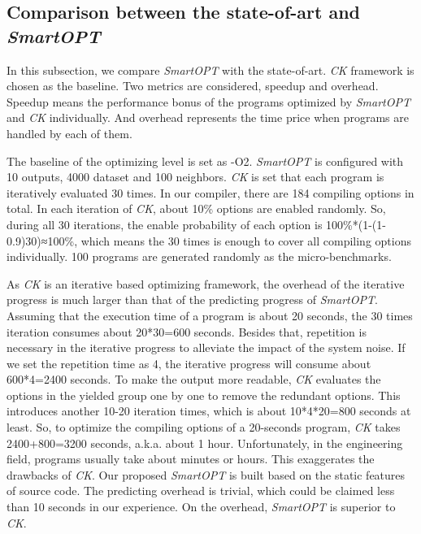 \documentclass[bst/sn-mathphys]{sn-jnl}%
\theoremstyle{thmstyleone}%
\theoremstyle{thmstyletwo}%
\theoremstyle{thmstylethree}%
\begin{document}
\subsection{Comparison between the state-of-art and \emph{SmartOPT}}

In this subsection, we compare \emph{SmartOPT} with the state-of-art. \emph{CK} 
framework is chosen as the baseline. Two metrics are considered, speedup and 
overhead. Speedup means the performance bonus of the programs optimized by 
\emph{SmartOPT} and \emph{CK} individually. And overhead represents the time 
price when programs are handled by each of them.

The baseline of the optimizing level is set as -O2\footnotemark[1]. 
\emph{SmartOPT} is configured with 10 outputs, 4000 dataset and 100 neighbors. 
\emph{CK} is set that each program is iteratively evaluated 30 times. In our 
compiler, there are 184 compiling options in total. In each iteration of 
\emph{CK}, about 10\% options are enabled randomly. So, during all 30 
iterations, the enable probability of each option is 100\%*(1-(1-0.9)30)≈100\%, 
which means the 30 times is enough to cover all compiling options individually. 
100 programs are generated randomly as the micro-benchmarks.


As \emph{CK} is an iterative based optimizing framework, the overhead of the 
iterative progress is much larger than that of the predicting progress of 
\emph{SmartOPT}. Assuming that the execution time of a program is about 20 
seconds, the 30 times iteration consumes about 20*30=600 seconds. Besides that, 
repetition is necessary in the iterative progress to alleviate the impact of 
the system noise. If we set the repetition time as 4, the iterative progress 
will consume about 600*4=2400 seconds. To make the output more readable, 
\emph{CK} evaluates the options in the yielded group one by one to remove the 
redundant options. This introduces another 10-20 iteration times, which is 
about 10*4*20=800 seconds at least. So, to optimize the compiling options of a 
20-seconds program, \emph{CK} takes 2400+800=3200 seconds, a.k.a. about 1 
hour. Unfortunately, in the engineering field, programs usually take about 
minutes or hours. This exaggerates the drawbacks of \emph{CK}. Our proposed 
\emph{SmartOPT} is built based on the static features of source code. The 
predicting overhead is trivial, which could be claimed less than 10 seconds in 
our experience. On the overhead, \emph{SmartOPT} is superior to \emph{CK}.
\end{document}
